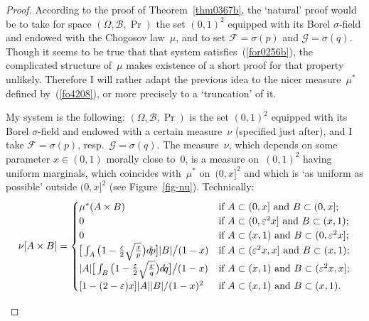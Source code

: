 \begin{proof}
According to the proof of Theorem~\ref{thm0367b},
the `natural' proof would be to take for space $(\Omega,\mathcal{B},\Pr)$
the set $(0,1)^2$ equipped with its Borel $\sigma$-field
and endowed with the Chogosov law~$\mu$,
and to set $\mathcal{F} = \sigma(p)$ and $\mathcal{G} = \sigma(q)$.
%
Though it seems to be true that that system satisfies~(\ref{for0256b}),
the complicated structure of~$\mu$ makes existence of a short proof for that property unlikely.
Therefore I will rather adapt the previous idea
to the nicer measure~$\mu^*$ defined by~(\ref{fo4208}),
or more precisely to a `truncation' of it.

My system is the following:
$(\Omega,\mathcal{B},\Pr)$ is the set $(0,1)^2$
equipped with its Borel $\sigma$-field and endowed with a certain measure~$\nu$
(specified just after), and I take $\mathcal{F} = \sigma(p)$, resp.\ $\mathcal{G} = \sigma(q)$.
The measure~$\nu$, which depends on some parameter $x \in (0,1)$ morally close to~$0$,
is a measure on~$(0,1)^2$ having uniform marginals,
which coincides with~$\mu^*$ on~$(0,x]^2$
and which is `as uniform as possible' outside $(0,x]^2$ (see Figure~\ref{fig-nu}).
Technically:
%
\[ \nu[A\times B] = \begin{cases}
\mu^*(A\times B) & \text{if $A \subset (0,x]$ and $B \subset (0,x]$;} \\
0 & \text{if $A \subset (0,\epsilon^2x]$ and $B \subset (x,1)$;} \\
0 & \text{if $A \subset (x,1)$ and $B \subset (0,\epsilon^2x]$;} \\
\big[ \int_A \big( 1 - \frac{\epsilon}{2}\sqrt{\frac{x}{p}} \big) \dx{p} \big] |B| \big/ (1-x)
& \text{if $A \subset (\epsilon^2x,x]$ and $B \subset (x,1)$;} \\
|A| \big[ \int_B \big( 1 - \frac{\epsilon}{2}\sqrt{\frac{x}{q}} \big) \dx{q} \big] \big/ (1-x)
& \text{if $A \subset (x,1)$ and $B \subset (\epsilon^2x,x]$;} \\
{[}1-(2-\epsilon)x] |A| |B| / (1-x)^2 & \text{if $A \subset (x,1)$ and $B \subset (x,1)$.}
\end{cases} \]
%
\begin{figure}
\centering
%
\end{figure}
\end{proof}
